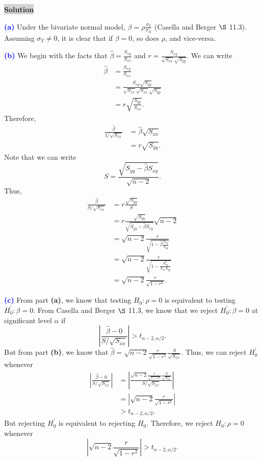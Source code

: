 \documentclass[12pt]{article}
\newcommand{\mybox}{%
    \collectbox{%
        \setlength{\fboxsep}{2pt}%
        \fbox{\BOXCONTENT}%
    }%
}
\begin{document}
\noindent\mybox{\colorbox{lightgray}{\textbf{Solution}}} \hspace{3mm}\hrulefill

\noindent \textcolor{blue}{\textbf{(a)}} Under the bivariate normal model, $\beta = \rho \frac{\sigma_Y}{\sigma_X}$ (Casella and Berger $\S$ 11.3). Assuming $\sigma_Y \neq 0$, it is clear that if $\beta = 0$, so does $\rho$, and vice-versa.

\vspace{3mm}

\noindent \textcolor{blue}{\textbf{(b)}} We begin with the facts that $\hat{\beta} = \frac{S_{xy}}{S_{xx}}$ and $r = \frac{S_{xy}}{\sqrt{S_{xx}}\sqrt{S_{yy}}}.$  We can write
\begin{align}
\hat{\beta} &= \frac{S_{xy}}{S_{xx}} \\
&= \frac{S_{xy}\sqrt{S_{yy}}}{\sqrt{S_{xx}}\sqrt{S_{xx}}\sqrt{S_{yy}}} \\
&= r \sqrt{\frac{S_{yy}}{S_{xx}}}.
\end{align}
Therefore,
\begin{align}
\frac{\hat{\beta}}{1/\sqrt{S_{xx}}} &= \hat{\beta}\sqrt{S_{xx}} \\
&= r\sqrt{S_{yy}}.
\end{align}
Note that we can write 
$$
S = \frac{\sqrt{S_{yy} - \hat{\beta}S_{xy}}}{\sqrt{n-2}}.
$$
Thus,
\begin{align}
\frac{\hat{\beta}}{S/\sqrt{S_{xx}}} &= r\frac{\sqrt{S_{yy}}}{S} \\
&= r \frac{\sqrt{S_{yy}}}{\sqrt{S_{yy}-\hat{\beta}S_{xy}}}\sqrt{n-2} \\
&= \sqrt{n-2}\frac{r}{\sqrt{1 - \hat{\beta}\frac{S_{xy}}{S_{yy}}}} \\
&= \sqrt{n-2}\frac{r}{\sqrt{1-\frac{S_{xy}^2}{S_{xx}S_{yy}}}} \\
&= \sqrt{n-2}\frac{r}{\sqrt{1-r^2}}.
\end{align}

\vspace{3mm}

\noindent \textcolor{blue}{\textbf{(c)}} From part \textbf{(a)}, we know that testing $H_0: \rho = 0$ is equivalent to testing $H_0^{\prime}: \beta = 0$. From Casella and Berger $\S$ 11.3, we know that we reject $H_0^{\prime}: \beta = 0$ at significant level $\alpha$ if $$\left|\frac{\hat{\beta}-0}{S/\sqrt{S_{xx}}}\right| > t_{n-2, \alpha/2}.$$ But from part \textbf{(b)}, we know that $\hat{\beta} = \sqrt{n-2}\frac{r}{\sqrt{1-r^2}}\frac{S}{\sqrt{S_{xx}}}$. Thus, we can reject $H_0^{\prime}$ whenever
\begin{align}
\left|\frac{\hat{\beta} - 0}{S/\sqrt{S_{xx}}}\right| &= \left|\frac{\sqrt{n-2}\frac{r}{\sqrt{1-r^2}}\frac{S}{\sqrt{S_{xx}}}}{S/\sqrt{S_{xx}}}\right| \\
&= \left|\sqrt{n-2}\frac{r}{\sqrt{1-r^2}}\right| \\
&> t_{n-2, \alpha/2}.
\end{align}
But rejecting $H_0^{\prime}$ is equivalent to rejecting $H_0$. Therefore, we reject $H_0: \rho = 0$ whenever 
$$
\left|\sqrt{n-2}\frac{r}{\sqrt{1-r^2}}\right| > t_{n-2, \alpha/2}.
$$
\end{document}
